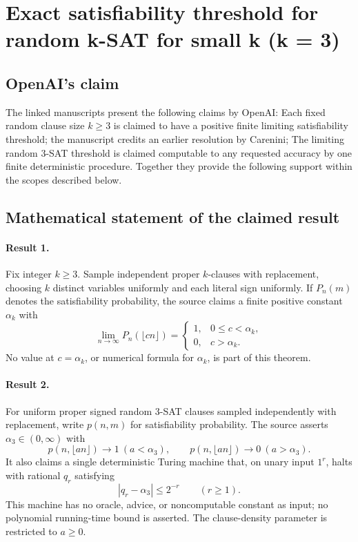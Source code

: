 \documentclass[11pt]{article}
\begin{document}
\section*{Exact satisfiability threshold for random k-SAT for small k (k = 3)}

\subsection{OpenAI's claim}
The linked manuscripts present the following claims by OpenAI: Each fixed random clause size $k\geq3$ is claimed to have a positive finite limiting satisfiability threshold; the manuscript credits an earlier resolution by Carenini; The limiting random 3-SAT threshold is claimed computable to any requested accuracy by one finite deterministic procedure. Together they provide the following support within the scopes described below.

\subsection{Mathematical statement of the claimed result}
\paragraph{Result 1.} Fix integer \(k\ge3\). Sample independent proper \(k\)-clauses with replacement, choosing \(k\) distinct variables uniformly and each literal sign uniformly. If \(P_n(m)\) denotes the satisfiability probability, the source claims a finite positive constant \(\alpha_k\) with
\[
 \lim_{n\to\infty}P_n(\lfloor cn\rfloor)=
 \begin{cases}1,&0\le c<\alpha_k,\\0,&c>\alpha_k.\end{cases}
\]
No value at \(c=\alpha_k\), or numerical formula for \(\alpha_k\), is part of this theorem.

\paragraph{Result 2.} For uniform proper signed random 3-SAT clauses sampled independently with replacement, write \(p(n,m)\) for satisfiability probability. The source asserts \(\alpha_3\in(0,\infty)\) with
\[
 p(n,\lfloor an\rfloor)\to1\ (a<\alpha_3),\qquad
 p(n,\lfloor an\rfloor)\to0\ (a>\alpha_3).
\]
It also claims a single deterministic Turing machine that, on unary input \(1^r\), halts with rational \(q_r\) satisfying
\[
 |q_r-\alpha_3|\le2^{-r}\qquad(r\ge1).
\]
This machine has no oracle, advice, or noncomputable constant as input; no polynomial running-time bound is asserted. The clause-density parameter is restricted to $a\ge0$.
\end{document}
